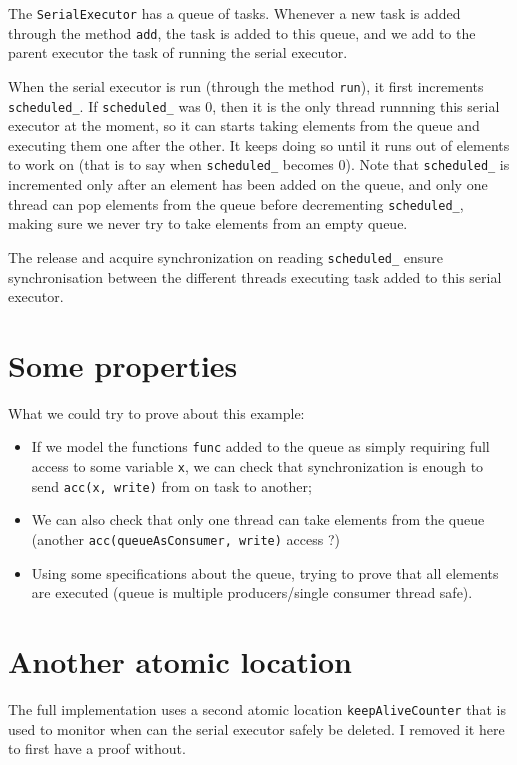 \documentclass[12pt]{article}
\begin{document}
The \texttt{SerialExecutor} has a queue of tasks. Whenever a new task is added through the method \texttt{add}, the task is added to this queue, and we add to the parent executor the task of running the serial executor.

When the serial executor is run (through the method \texttt{run}), it first increments \texttt{scheduled\_}. If \texttt{scheduled\_} was 0, then it is the only thread runnning this serial executor at the moment, so it can starts taking elements from the queue and executing them one after the other. It keeps doing so until it runs out of elements to work on (that is to say when \texttt{scheduled\_} becomes 0). Note that \texttt{scheduled\_} is incremented only after an element has been added on the queue, and only one thread can pop elements from the queue before decrementing \texttt{scheduled\_}, making sure we never try to take elements from an empty queue.

The release and acquire synchronization on reading \texttt{scheduled\_} ensure synchronisation between the different threads executing task added to this serial executor.

\section{Some properties}
What we could try to prove about this example:
\begin{itemize}
	\item If we model the functions \texttt{func} added to the queue as simply requiring full access to some variable \texttt{x}, we can check that synchronization is enough to send \texttt{acc(x, write)} from on task to another;
	\item We can also check that only one thread can take elements from the queue (another \texttt{acc(queueAsConsumer, write)} access ?)
	\item Using some specifications about the queue, trying to prove that all elements are executed (queue is multiple producers/single consumer thread safe).
\end{itemize}

\section{Another atomic location}
The full implementation uses a second atomic location \texttt{keepAliveCounter} that is used to monitor when can the serial executor safely be deleted. I removed it here to first have a proof without.
\end{document}
